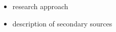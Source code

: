 \documentclass[./sources.tex]{subfiles}
\begin{document}
    \begin{itemize}
        \item research approach
        \item description of secondary sources
    \end{itemize}
\end{document}
